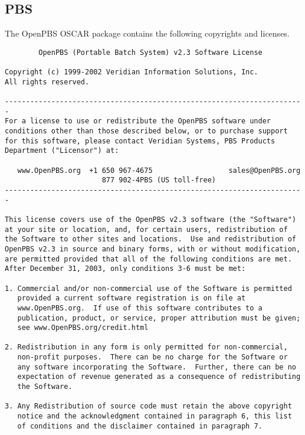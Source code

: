 %
%
%

\subsection{PBS}

The OpenPBS OSCAR package contains the following copyrights and
licenses.

\begin{verbatim}
        OpenPBS (Portable Batch System) v2.3 Software License

Copyright (c) 1999-2002 Veridian Information Solutions, Inc.
All rights reserved.

-----------------------------------------------------------------------
For a license to use or redistribute the OpenPBS software under
conditions other than those described below, or to purchase support
for this software, please contact Veridian Systems, PBS Products
Department ("Licensor") at:

   www.OpenPBS.org  +1 650 967-4675                  sales@OpenPBS.org
                       877 902-4PBS (US toll-free)
-----------------------------------------------------------------------

This license covers use of the OpenPBS v2.3 software (the "Software")
at your site or location, and, for certain users, redistribution of
the Software to other sites and locations.  Use and redistribution of
OpenPBS v2.3 in source and binary forms, with or without modification,
are permitted provided that all of the following conditions are met.
After December 31, 2003, only conditions 3-6 must be met:

1. Commercial and/or non-commercial use of the Software is permitted
   provided a current software registration is on file at
   www.OpenPBS.org.  If use of this software contributes to a
   publication, product, or service, proper attribution must be given;
   see www.OpenPBS.org/credit.html

2. Redistribution in any form is only permitted for non-commercial,
   non-profit purposes.  There can be no charge for the Software or
   any software incorporating the Software.  Further, there can be no
   expectation of revenue generated as a consequence of redistributing
   the Software.

3. Any Redistribution of source code must retain the above copyright
   notice and the acknowledgment contained in paragraph 6, this list
   of conditions and the disclaimer contained in paragraph 7.


\end{verbatim}
